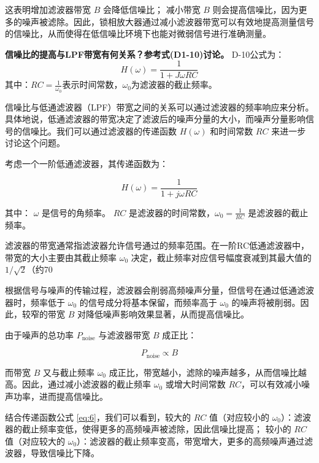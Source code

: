 \documentclass[dvipsnames, svgnames,a4paper,11pt]{article}
\begin{document}
		这表明增加滤波器带宽 \( B \) 会降低信噪比； 减小带宽 \( B \) 则会提高信噪比，因为更多的噪声被滤除。因此，锁相放大器通过减小滤波器带宽可以有效地提高测量信号的信噪比，从而使得在低信噪比环境下也能对微弱信号进行准确测量。

	\vspace{1cm}
    \textbf{信噪比的提高与LPF带宽有何关系？参考式(D1-10)讨论。}
	D-10公式为：
\begin{equation}
	H(\omega) = \frac{1}{1+ J \omega R C}
	\label{eq:10}
\end{equation}
其中：$RC= \frac{1}{\omega_0}$表示时间常数，$\omega_0$为滤波器的截止频率。

信噪比与低通滤波器（LPF）带宽之间的关系可以通过滤波器的频率响应来分析。具体地说，低通滤波器的带宽决定了滤波后的噪声分量的大小，而噪声分量影响信号的信噪比。我们可以通过滤波器的传递函数 \( H(\omega) \) 和时间常数 \( RC \) 来进一步讨论这个问题。

考虑一个一阶低通滤波器，其传递函数为：

\begin{equation}
	H(\omega) = \frac{1}{1 + j\omega RC}
    \label{eq:6}
\end{equation}

其中：
 \( \omega \) 是信号的角频率。
 \( RC \) 是滤波器的时间常数，\( \omega_0 = \frac{1}{RC} \) 是滤波器的截止频率。

滤波器的带宽通常指滤波器允许信号通过的频率范围。在一阶RC低通滤波器中，带宽的大小主要由其截止频率 \( \omega_0 \) 决定，截止频率对应信号幅度衰减到其最大值的 \( 1/\sqrt{2} \)（约70%

根据信号与噪声的传输过程，滤波器会削弱高频噪声分量，但信号在通过低通滤波器时，频率低于 \( \omega_0 \) 的信号成分将基本保留，而频率高于 \( \omega_0 \) 的噪声将被削弱。因此，较窄的带宽 \( B \) 对降低噪声影响效果显著，从而提高信噪比。

由于噪声的总功率 \( P_{\text{noise}} \) 与滤波器带宽 \( B \) 成正比：

\[
P_{\text{noise}} \propto B
\]

而带宽 \( B \) 又与截止频率 \( \omega_0 \) 成正比，带宽越小，滤除的噪声越多，从而信噪比越高。因此，通过减小滤波器的截止频率 \( \omega_0 \) 或增大时间常数 \( RC \)，可以有效减小噪声功率，进而提高信噪比。

结合传递函数公式 \ref{eq:6}，我们可以看到，较大的 \( RC \) 值（对应较小的 \( \omega_0 \)）：滤波器的截止频率变低，使得更多的高频噪声被滤除，因此信噪比提高；
较小的 \( RC \) 值（对应较大的 \( \omega_0 \)）：滤波器的截止频率变高，带宽增大，更多的高频噪声通过滤波器，导致信噪比下降。
\end{document}
